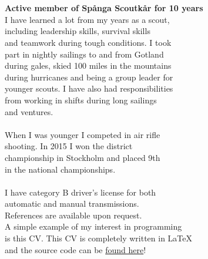 \documentclass[11pt,oneside,a4paper,titlepage]{article}
\begin{document}
\begin{tcolorbox}
    \begin{minipage}[t]{2cm}
        \begin{tcolorbox}[colframe=white,colback=white]
            
        \end{tcolorbox}
    \end{minipage}
    \begin{minipage}[t]{15cm}
        \begin{tcolorbox}[colframe=white,colback=white]
            {\selectfont
                \\
                \\\textbf{Active member of Spånga Scoutkår for 10 years}\\
                I have learned a lot from my years as a scout,\\
                including leadership skills, survival skills\\
                and teamwork during tough conditions. I took\\
                part in nightly sailings to and from Gotland\\
                during gales, skied 100 miles in the mountains\\
                during hurricanes and being a group leader for\\
                younger scouts. I have also had responsibilities\\
                from working in shifts during long sailings\\
                and ventures.\\\\
                When I was younger I competed in air rifle\\
                shooting. In 2015 I won the district\\
                championship in Stockholm and placed 9th\\
                in the national championships.\\\\
                I have category B driver's license for both\\
                automatic and manual transmissions.\\

                References are available upon request.\\

                A simple example of my interest in programming\\
                is this CV. This CV is completely written in \LaTeX\\
                and the source code can be \href{https://github.com/v-olin/resume}{found here}!
            }
        \end{tcolorbox}
    \end{minipage}
\end{tcolorbox}
\end{document}
